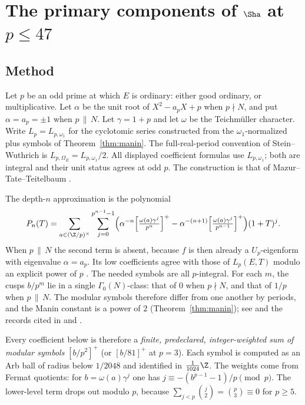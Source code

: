 \section[Primary components at primes up to 47]{The primary components of $\Sha$ at $p\le47$}\label{sec:primary}

\subsection{Method}\label{subsec:method}
Let $p$ be an odd prime at which $E$ is ordinary: either good ordinary, or multiplicative. Let $\alpha$ be the unit root of $X^2-a_pX+p$ when $p\nmid N$, and put $\alpha=a_p=\pm1$ when $p\,\|\,N$. Let $\gamma=1+p$ and let $\omega$ be the Teichm\"uller character. Write $L_p=L_{p,\omega_1}$ for the cyclotomic series constructed from the $\omega_1$-normalized plus symbols of Theorem~\ref{thm:manin}. The full-real-period convention of Stein--Wuthrich \cite{sw} is $L_{p,\Omega_E}=L_{p,\omega_1}/2$. All displayed coefficient formulas use $L_{p,\omega_1}$; both are integral and their unit status agrees at odd $p$. The construction is that of Mazur--Tate--Teitelbaum \cite{mtt}.

The depth-$n$ approximation is the polynomial
\[
P_n(T)=\sum_{a\in(\Z/p)^\times}\sum_{j=0}^{p^{n-1}-1}\Bigl(\alpha^{-n}\Bigl[\tfrac{\omega(a)\gamma^j}{p^n}\Bigr]^+-\alpha^{-(n+1)}\Bigl[\tfrac{\omega(a)\gamma^j}{p^{n-1}}\Bigr]^+\Bigr)(1+T)^j .
\]
When $p\,\|\,N$ the second term is absent, because $f$ is then already a $U_p$-eigenform with eigenvalue $\alpha=a_p$. Its low coefficients agree with those of $L_p(E,T)$ modulo an explicit power of $p$ \cite[Prop.~3.5]{sw}. The needed symbols are all $p$-integral. For each $m$, the cusps $b/p^m$ lie in a single $\Gamma_0(N)$-class: that of $0$ when $p\nmid N$, and that of $1/p$ when $p\,\|\,N$. The modular symbols therefore differ from one another by periods, and the Manin constant is a power of $2$ (Theorem~\ref{thm:manin}); see \cite[\S3]{sw} and the records cited in  and .

Every coefficient below is therefore a \emph{finite, predeclared, integer-weighted sum of modular symbols} $[b/p^2]^+$ (or $[b/81]^+$ at $p=3$). Each symbol is computed as an Arb ball of radius below $1/2048$ and identified in $\frac1{1024}\Z$. The weights come from Fermat quotients: for $b=\omega(a)\gamma^j$ one has $j\equiv-(b^{p-1}-1)/p\pmod p$. The lower-level term drops out modulo $p$, because $\sum_{j<p}\binom j2=\binom p3\equiv0$ for $p\ge5$.

